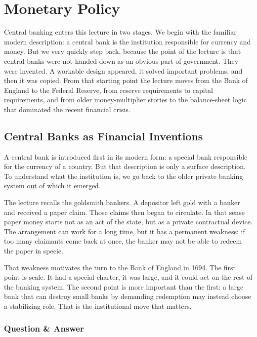 \chapter{Monetary Policy}

Central banking enters this lecture in two stages. We begin with the familiar modern description: a central bank is the institution responsible for currency and money. But we very quickly step back, because the point of the lecture is that central banks were not handed down as an obvious part of government. They were invented. A workable design appeared, it solved important problems, and then it was copied. From that starting point the lecture moves from the Bank of England to the Federal Reserve, from reserve requirements to capital requirements, and from older money-multiplier stories to the balance-sheet logic that dominated the recent financial crisis.

\section{Central Banks as Financial Inventions}

A central bank is introduced first in its modern form: a special bank responsible for the currency of a country. But that description is only a surface description. To understand what the institution is, we go back to the older private banking system out of which it emerged.

The lecture recalls the goldsmith bankers. A depositor left gold with a banker and received a paper claim. Those claims then began to circulate. In that sense paper money starts not as an act of the state, but as a private contractual device. The arrangement can work for a long time, but it has a permanent weakness: if too many claimants come back at once, the banker may not be able to redeem the paper in specie.

That weakness motivates the turn to the Bank of England in 1694. The first point is scale. It had a special charter, it was large, and it could act on the rest of the banking system. The second point is more important than the first: a large bank that can destroy small banks by demanding redemption may instead choose a stabilizing role. That is the institutional move that matters.

\subsection{Question \& Answer}

